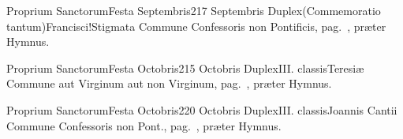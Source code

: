 \documentclass[psalterium-tridentinum.tex]{subfiles}
\begin{document}
	{Proprium Sanctorum}{Festa Septembris}{2}{17 Septembris}
	{Duplex}{(Commemoratio tantum)}{Francisci!Stigmata}
	{Commune Confessoris non Pontificis, pag.\ \pageref{M-CONP}, præter Hymnus.}
	{}

	{Proprium Sanctorum}{Festa Octobris}{2}{15 Octobris}
	{Duplex}{III. classis}{Teresiæ}
	{Commune aut Virginum aut non Virginum, pag.\ \pageref{M-MU}, præter Hymnus.}
	{}

	{Proprium Sanctorum}{Festa Octobris}{2}{20 Octobris}
	{Duplex}{III. classis}{Joannis Cantii}
	{Commune Confessoris non Pont., pag.\ \pageref{M-CONP}, præter Hymnus.}
	{}
\end{document}
